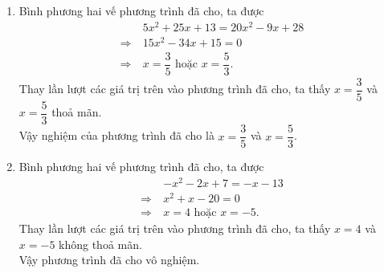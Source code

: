\begin{bt}
{\begin{enumerate}
			Vậy nghiệm của phương trình đã cho là $x=-2$ và $x=\dfrac{5}{6}$.
			\item
			Bình phương hai vế phương trình đã cho,  ta được 
			\begin{align*}
				& 5 x^{2}+25 x+13=20 x^{2}-9 x+28 \\
				\Rightarrow~ &15x^{2}-34x+15=0\\
				\Rightarrow~ &x=\dfrac{3}{5} \text { hoặc } x=\dfrac{5}{3}.
			\end{align*}
			Thay lần lượt các giá trị trên vào phương trình đã cho, ta thấy $x=\dfrac{3}{5}$ và $x=\dfrac{5}{3}$ thoả mãn. \\
			Vậy nghiệm của phương trình đã cho là $x=\dfrac{3}{5}$ và $x=\dfrac{5}{3}$.
			\item
			Bình phương hai vế phương trình đã cho,  ta được 
			\begin{align*}
				& -x^{2}-2 x+7=-x-13 \\
				\Rightarrow~ & x^{2}+x-20=0\\
				\Rightarrow~ &x=4 \text { hoặc } x=-5.
			\end{align*}
			Thay lần lượt các giá trị trên vào phương trình đã cho, ta thấy $x=4$ và $x=-5$  không thoả mãn. \\
			Vậy phương trình đã cho vô nghiệm.
		\end{enumerate}
	}
\end{bt}

